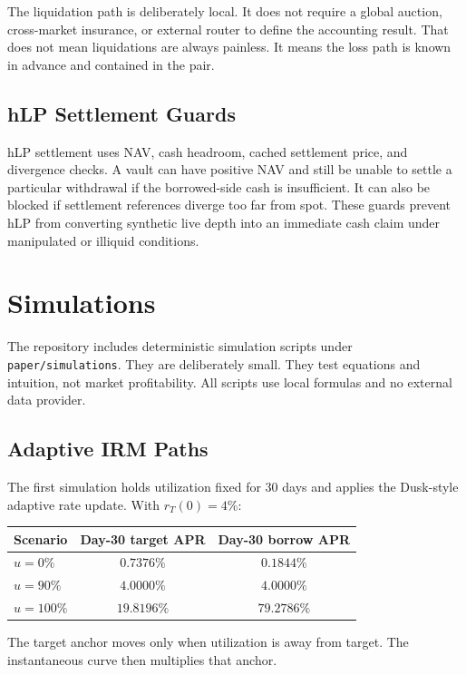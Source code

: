 \documentclass[11pt]{article}
\begin{document}
The liquidation path is deliberately local. It does not require a global auction, cross-market insurance, or external router to define the accounting result. That does not mean liquidations are always painless. It means the loss path is known in advance and contained in the pair.

\subsection{hLP Settlement Guards}

hLP settlement uses NAV, cash headroom, cached settlement price, and divergence checks. A vault can have positive NAV and still be unable to settle a particular withdrawal if the borrowed-side cash is insufficient. It can also be blocked if settlement references diverge too far from spot. These guards prevent hLP from converting synthetic live depth into an immediate cash claim under manipulated or illiquid conditions.

\section{Simulations}

The repository includes deterministic simulation scripts under \texttt{paper/simulations}. They are deliberately small. They test equations and intuition, not market profitability. All scripts use local formulas and no external data provider.

\subsection{Adaptive IRM Paths}

The first simulation holds utilization fixed for 30 days and applies the Dusk-style adaptive rate update. With $r_T(0)=4\%$:
\begin{center}
\begin{tabular}{lcc}
\toprule
Scenario & Day-30 target APR & Day-30 borrow APR \\
\midrule
$u=0\%$ & $0.7376\%$ & $0.1844\%$ \\
$u=90\%$ & $4.0000\%$ & $4.0000\%$ \\
$u=100\%$ & $19.8196\%$ & $79.2786\%$ \\
\bottomrule
\end{tabular}
\end{center}
The target anchor moves only when utilization is away from target. The instantaneous curve then multiplies that anchor.
\end{document}
